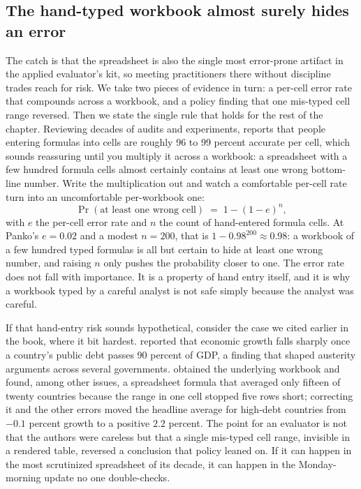 \documentclass[
    a4paper,
    fontsize=10pt,
    twoside=true,
    numbers=noenddot,
]{kaobook}
\begin{document}
\subsection{The hand-typed workbook almost surely hides an error}\label{sec:ch11-spreadsheet-risk}
The catch is that the spreadsheet is also the single most error-prone artifact in the applied evaluator's kit, so meeting practitioners there without discipline trades reach for risk. We take two pieces of evidence in turn: a per-cell error rate that compounds across a workbook, and a policy finding that one mis-typed cell range reversed. Then we state the single rule that holds for the rest of the chapter. Reviewing decades of audits and experiments, \textcite{panko1998errors} reports that people entering formulas into cells are roughly 96 to 99 percent accurate per cell, which sounds reassuring until you multiply it across a workbook: a spreadsheet with a few hundred formula cells almost certainly contains at least one wrong bottom-line number. Write the multiplication out and watch a comfortable per-cell rate turn into an uncomfortable per-workbook one:
\[
\Pr(\text{at least one wrong cell}) \;=\; 1-(1-e)^{n},
\]
with \(e\) the per-cell error rate and \(n\) the count of hand-entered formula cells. At Panko's \(e=0.02\) and a modest \(n=200\), that is \(1-0.98^{200}\approx 0.98\): a workbook of a few hundred typed formulas is all but certain to hide at least one wrong number, and raising \(n\) only pushes the probability closer to one. The error rate does not fall with importance. It is a property of hand entry itself, and it is why a workbook typed by a careful analyst is not safe simply because the analyst was careful.

If that hand-entry risk sounds hypothetical, consider the case we cited earlier in the book, where it bit hardest. \textcite{reinhart2010debt} reported that economic growth falls sharply once a country's public debt passes 90 percent of GDP, a finding that shaped austerity arguments across several governments. \textcite{herndon2014debt} obtained the underlying workbook and found, among other issues, a spreadsheet formula that averaged only fifteen of twenty countries because the range in one cell stopped five rows short; correcting it and the other errors moved the headline average for high-debt countries from $-0.1$ percent growth to a positive $2.2$ percent. The point for an evaluator is not that the authors were careless but that a single mis-typed cell range, invisible in a rendered table, reversed a conclusion that policy leaned on. If it can happen in the most scrutinized spreadsheet of its decade, it can happen in the Monday-morning update no one double-checks.
\end{document}
